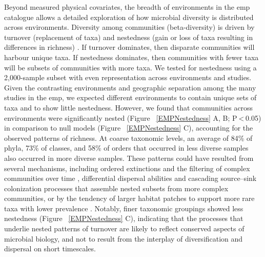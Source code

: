 Beyond measured physical covariates, the breadth of environments in the \gls{emp}
catalogue allows a detailed exploration of how microbial diversity is distributed
across environments. Diversity among communities (beta-diversity) is driven by
turnover (replacement of taxa) and nestedness (gain or loss of taxa resulting in
differences in richness) \cite{Carvalho2013}. If turnover dominates, then
disparate communities will harbour unique taxa. If nestedness dominates, then
communities with fewer taxa will be subsets of communities with more taxa. We
tested for nestedness using a 2,000-sample subset with even representation across
environments and studies. Given the contrasting environments and geographic separation
among the many studies in the \gls{emp}, we expected different environments to
contain unique sets of taxa and to show little nestedness. However, we found that
communities across environments were significantly nested (Figure ~\ref{EMPNestedness} A, B; P < 0.05)
in comparison to null models (Figure ~\ref{EMPNestedness} C), accounting for the
observed patterns of richness. At coarse taxonomic levels, an average of 84\% of phyla,
73\% of classes, and 58\% of orders that occurred in less diverse samples also
occurred in more diverse samples. These patterns could have resulted from several
mechanisms, including ordered extinctions \cite{Sonnenburg2016} and the filtering
of complex communities over time \cite{Atmar1993}, differential dispersal
abilities \cite{Lomolino1996} and cascading source–sink colonization processes
that assemble nested subsets from more complex communities, or by the tendency
of larger habitat patches to support more rare taxa with lower prevalence \cite{Gaston2000}.
Notably, finer taxonomic groupings showed less nestedness (Figure ~\ref{EMPNestedness} C),
indicating that the processes that underlie nested patterns of turnover are
likely to reflect conserved aspects of microbial biology, and not to result from
the interplay of diversification and dispersal on short timescales.

